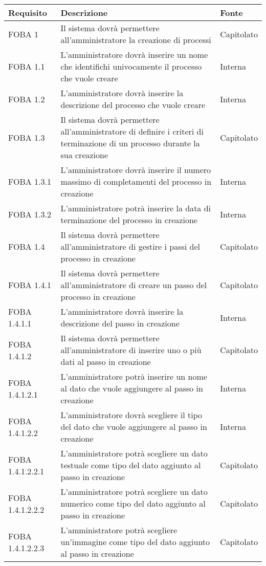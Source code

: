\begin{longtable}{lXp{}}
\toprule
\textbf{Requisito} & \textbf{Descrizione} & \textbf{Fonte}\\
\toprule
FOBA 1&Il sistema dovrà permettere all'amministratore la creazione di processi&Capitolato\\
\midrule
FOBA 1.1&L'amministratore dovrà inserire un nome che identifichi univocamente il processo che vuole creare&Interna\\
\midrule
FOBA 1.2&L'amministratore dovrà inserire la descrizione del processo che vuole creare &Interna\\
\midrule
FOBA 1.3&Il sistema dovrà permettere all'amministratore di definire i criteri di terminazione di un processo durante la sua creazione&Capitolato\\
\midrule
FOBA 1.3.1&L'amministratore dovrà inserire il numero massimo di completamenti del processo in creazione &Interna\\
\midrule
FOBA 1.3.2&L'amministratore potrà inserire la data di terminazione del processo in creazione&Interna\\
\midrule
FOBA 1.4&Il sistema dovrà permettere all'amministratore di gestire i passi del processo in creazione&Capitolato\\
\midrule
FOBA 1.4.1&Il sistema dovrà permettere all'amministratore di creare un passo del processo in creazione&Capitolato\\
\midrule
FOBA 1.4.1.1&L'amministratore dovrà inserire la descrizione del passo in creazione&Interna\\
\midrule
FOBA 1.4.1.2&Il sistema dovrà permettere all'amministratore di inserire uno o più dati al passo in creazione&Capitolato\\
\midrule
FOBA 1.4.1.2.1&L'amministratore potrà inserire un nome al dato che vuole aggiungere al passo in creazione&Interna\\
\midrule
FOBA 1.4.1.2.2&L'amministratore dovrà scegliere il tipo del dato che vuole aggiungere al passo in creazione&Interna\\
\midrule
FOBA 1.4.1.2.2.1&L'amministratore potrà scegliere un dato testuale come tipo del dato aggiunto al passo in creazione&Capitolato\\
\midrule
FOBA 1.4.1.2.2.2&L'amministratore potrà scegliere un dato numerico come tipo del dato aggiunto al passo in creazione&Capitolato\\
\midrule
FOBA 1.4.1.2.2.3&L'amministratore potrà scegliere un'immagine come tipo del dato aggiunto al passo in creazione&Capitolato\\

\end{longtable}
